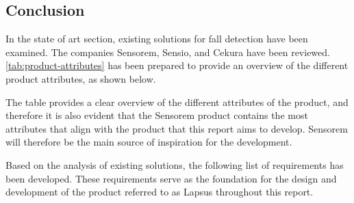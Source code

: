 \subsection{Conclusion}
In the state of art section, existing solutions for fall detection have been examined. The companies Sensorem, Sensio, and Cekura have been reviewed. \autoref{tab:product-attributes} has been prepared to provide an overview of the different product attributes, as shown below.

\begin{table}[H]
\centering
{}
\caption{Table of the product attributes}
\label{tab:product-attributes}
\end{table}

The table provides a clear overview of the different attributes of the product, and therefore it is also evident that the Sensorem product contains the most attributes that align with the product that this report aims to develop. Sensorem will therefore be the main source of inspiration for the development.

Based on the analysis of existing solutions, the following list of requirements has been developed. These requirements serve as the foundation for the design and development of the product referred to as Lapsus throughout this report.

